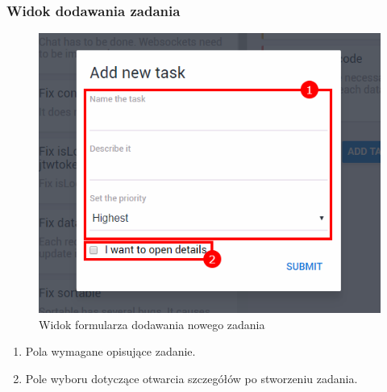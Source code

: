 \documentclass[eng,printmode]{mgr}
\begin{document}
\subsubsection{Widok dodawania zadania}
\begin{figure}[H]
  \begin{center}
  \includegraphics[scale=0.8]{add_task}
  \end{center}
  \caption{Widok formularza dodawania nowego zadania}
\end{figure}
\begin{enumerate}
  \item Pola wymagane opisujące zadanie.
  \item Pole wyboru dotyczące otwarcia szczegółów po  stworzeniu zadania.
\end{enumerate}
\newpage
\end{document}

